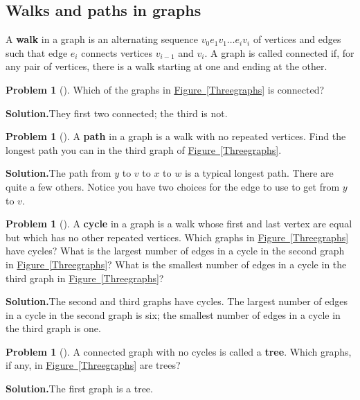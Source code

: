 \documentclass[10pt,]{book}
\newcommand{\terminology}[1]{\textbf{#1}}
\theoremstyle{plain}
\theoremstyle{definition}
\newtheorem{activity}[project]{Problem}
\theoremstyle{definition}
\numberwithin{equation}{chapter}
\begin{document}
\subsection[{Walks and paths in graphs}]{Walks and paths in graphs}\label{subsection-16}
A \terminology{walk} in a graph is an alternating sequence \(v_0e_1v_1\ldots
e_iv_i\) of vertices and edges such that edge \(e_i\) connects vertices \(v_{i-1}\) and \(v_i\). A graph is called connected if, for any pair of vertices, there is a walk starting at one and ending at the other.%
\begin{activity}[]\label{connectedanddisconnected}
Which of the graphs in \hyperref[Threegraphs]{Figure~\ref{Threegraphs}} is connected?%
\par\medskip\noindent%
\textbf{Solution.}\quad They first two connected; the third is not.%
\end{activity}
\begin{activity}[]\label{activity-105}
A \terminology{path} in a graph is a walk with no repeated vertices.  Find the longest path you can in the third graph of \hyperref[Threegraphs]{Figure~\ref{Threegraphs}}.%
\par\medskip\noindent%
\textbf{Solution.}\quad The path from \(y\) to \(v\) to \(x\) to \(w\) is a typical longest path. There are quite a few others. Notice you have two choices for the edge to use to get from \(y\) to \(v\).%
\end{activity}
\begin{activity}[]\label{activity-106}
A \terminology{cycle} in a graph is a walk whose first and last vertex are equal but which has no other repeated vertices.  Which graphs in \hyperref[Threegraphs]{Figure~\ref{Threegraphs}} have cycles?  What is the largest number of edges in a cycle in the second graph in \hyperref[Threegraphs]{Figure~\ref{Threegraphs}}?  What is the smallest number of edges in a cycle in the third graph in \hyperref[Threegraphs]{Figure~\ref{Threegraphs}}?%
\par\medskip\noindent%
\textbf{Solution.}\quad The second and third graphs have cycles. The largest number of edges in a cycle in the second graph is six; the smallest number of edges in a cycle in the third graph is one.%
\end{activity}
\begin{activity}[]\label{activity-107}
A connected graph with no cycles is called a \terminology{tree}.  Which graphs, if any, in \hyperref[Threegraphs]{Figure~\ref{Threegraphs}} are trees?%
\par\medskip\noindent%
\textbf{Solution.}\quad The first graph is a tree.%
\end{activity}
\typeout{************************************************}
\typeout{************************************************}
\end{document}

